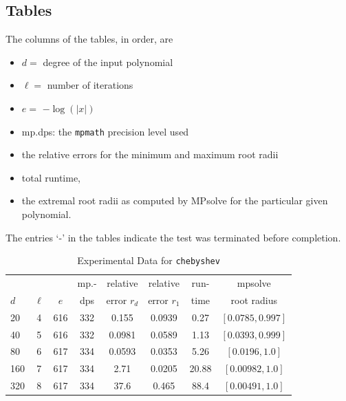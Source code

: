 \documentclass[runningheads]{llncs}
\begin{document}
\subsection{Tables}
The columns of the tables, in order, are
\begin{itemize} 
\item $d =$ degree of the input polynomial
\item $\ell =$ number of iterations
\item $e =$ $-\log(|x|)$
\item mp.dps: the \texttt{mpmath} precision level used
\item the relative errors for the minimum and maximum root radii
\item total runtime,
\item the extremal root radii as computed by MPsolve for the particular given polynomial.
\end{itemize}

 The entries `-' in the tables indicate the test was terminated before completion.


\begin{table}
\caption{Experimental Data for \texttt{chebyshev}} %
\label{tab:chebyshev}
\vskip -0.15in
\begin{center}
\begin{small}
\begin{sc}
\begin{tabular}{lccccccc}
\toprule
&  &  & mp.-& relative  & relative & run- & mpsolve \\
$d$& $\ell$& $e$ & dps&error $r_d$       & error $r_1$ &time& root radius\\
\midrule
 20 & 4 & 616 & 332 & 0.155 & 0.0939 & 0.27 & $[0.0785, 0.997]$\\
 40 & 5 & 616 & 332 & 0.0981 & 0.0589 & 1.13 & $[0.0393, 0.999]$\\
 80 & 6 & 617 & 334 & 0.0593 & 0.0353 & 5.26 & $[0.0196, 1.0]$\\
 160 & 7 & 617 & 334 & 2.71 & 0.0205 & 20.88 & $[0.00982, 1.0]$\\
 320 & 8 & 617 & 334 & 37.6 & 0.465 & 88.4 & $[0.00491, 1.0]$\\
\bottomrule
\end{tabular}
\end{sc}
\end{small}
\end{center}
\vskip 0.05in
\end{table}
\end{document}
